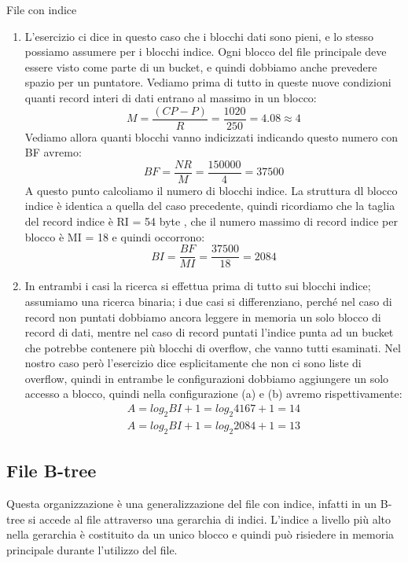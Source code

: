 \begin{Example}{File con indice}{}
\begin{enumerate}[label=(\alph*)]
        \item L'esercizio ci dice in questo caso che i blocchi dati sono pieni, e lo stesso possiamo assumere per i blocchi indice. Ogni blocco del file principale deve essere visto come parte di un bucket, e quindi dobbiamo anche prevedere spazio per un puntatore. Vediamo prima di tutto in queste nuove condizioni quanti record interi di dati entrano al massimo in un blocco:
        \begin{equation*}
            M=\frac{(CP-P)}{R}=\frac{1020}{250}=4.08\approx 4
        \end{equation*}
        Vediamo allora quanti blocchi vanno indicizzati indicando questo numero con BF avremo:
        \begin{equation*}
            BF=\frac{NR}{M}=\frac{150000}{4}=37500
        \end{equation*}
        A questo punto calcoliamo il numero di blocchi indice. La struttura dl blocco indice è identica a quella del caso precedente, quindi ricordiamo che la taglia del record indice è RI = 54 byte , che il numero massimo di record indice per blocco è MI = 18 e quindi occorrono:
        \begin{equation*}
            BI=\frac{BF}{MI}=\frac{37500}{18}=2084
        \end{equation*}

        \item In entrambi i casi la ricerca si effettua prima di tutto sui blocchi indice; assumiamo una ricerca binaria; i due casi si differenziano, perché nel caso di record non puntati dobbiamo ancora leggere in memoria un solo blocco di record di dati, mentre nel caso di record puntati l'indice punta ad un bucket che potrebbe contenere più blocchi di overflow, che vanno tutti esaminati. Nel nostro caso però l'esercizio dice esplicitamente che non ci sono liste di overflow, quindi in entrambe le configurazioni dobbiamo aggiungere un solo accesso a blocco, quindi nella configurazione (a) e (b) avremo rispettivamente:
        \begin{gather*}
            A = log_2 BI + 1 = log_2 4167 + 1 = 14\\
            A = log_2 BI + 1 = log_2 2084 + 1 = 13
        \end{gather*}
    \end{enumerate}
\end{Example}

\subsection{File B-tree}
Questa organizzazione è una generalizzazione del file con indice, infatti in un B-tree si accede al file attraverso
una gerarchia di indici. L'indice a livello più alto nella gerarchia è costituito da un unico blocco e quindi può risiedere in memoria principale durante l'utilizzo del file. 

